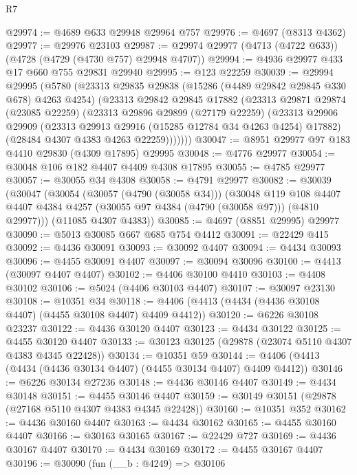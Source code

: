 \begin{lexlean}{R7}
\begin{coremodule}
@29974 := @4689 @633 @29948 @29964 @757
@29976 := @4697 (@8313 @4362)
@29977 := @29976 @23103
@29987 := @29974 @29977 (@4713 (@4722 @633)) (@4728 (@4729 (@4730 @757) @29948 @4707))
@29994 := @4936 @29977 @433 @17 @660 @755 @29831 @29940
@29995 := @123 @22259
@30039 := @29994
    @29995
    (@5780
      (@23313
        @29835
        @29838
        (@15286 (@4489 @29842 @29845 @330 @678) @4263 @4254)
        (@23313
          @29842
          @29845
          @17882
          (@23313
            @29871
            @29874
            (@23085 @22259)
            (@23313
              @29896
              @29899
              (@27179 @22259)
              (@23313
                @29906
                @29909
                (@23313 @29913 @29916 (@15285 @12784 @34 @4263 @4254) @17882)
                (@28484 @4307 @4383 @4263 @22259)))))))
@30047 := @8951 @29977 @97 @183 @4410 @29830 (@4309 @17895) @29995
@30048 := @4776 @29977
@30054 := @30048 @106 @182 @4407 @4409 @4308 @17895
@30055 := @4785 @29977
@30057 := @30055 @34 @4308
@30058 := @4791 @29977
@30082 := @30039
    (@30047
      (@30054
        (@30057 (@4790 (@30058 @34)))
        (@30048
          @119
          @108
          @4407
          @4407
          @4384
          @4257
          (@30055 @97 @4384 (@4790 (@30058 @97)))
          (@4810 @29977)))
      (@11085 @4307 @4383))
@30085 := @4697 (@8851 @29995) @29977
@30090 := @5013 @30085 @667 @685 @754 @4412
@30091 := @22429 @415
@30092 := @4436 @30091
@30093 := @30092 @4407
@30094 := @4434 @30093
@30096 := @4455 @30091 @4407
@30097 := @30094 @30096
@30100 := @4413 (@30097 @4407 @4407)
@30102 := @4406 @30100 @4410
@30103 := @4408 @30102
@30106 := @5024 (@4406 @30103 @4407)
@30107 := @30097 @23130
@30108 := @10351 @34
@30118 := @4406 (@4413 (@4434 (@4436 @30108 @4407) (@4455 @30108 @4407) @4409 @4412))
@30120 := @6226 @30108 @23237
@30122 := @4436 @30120 @4407
@30123 := @4434 @30122
@30125 := @4455 @30120 @4407
@30133 := @30123 @30125 (@29878 (@23074 @5110 @4307 @4383 @4345 @22428))
@30134 := @10351 @59
@30144 := @4406 (@4413 (@4434 (@4436 @30134 @4407) (@4455 @30134 @4407) @4409 @4412))
@30146 := @6226 @30134 @27236
@30148 := @4436 @30146 @4407
@30149 := @4434 @30148
@30151 := @4455 @30146 @4407
@30159 := @30149 @30151 (@29878 (@27168 @5110 @4307 @4383 @4345 @22428))
@30160 := @10351 @352
@30162 := @4436 @30160 @4407
@30163 := @4434 @30162
@30165 := @4455 @30160 @4407
@30166 := @30163 @30165
@30167 := @22429 @727
@30169 := @4436 @30167 @4407
@30170 := @4434 @30169
@30172 := @4455 @30167 @4407
@30196 := @30090
    (fun (__b : @4249) =>
    @30106

\end{coremodule}
\end{lexlean}
